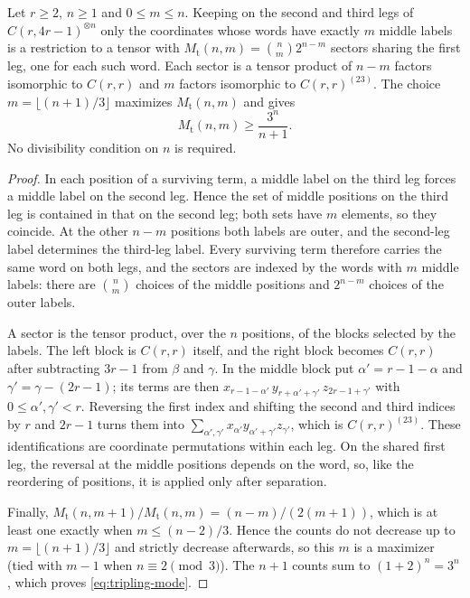 \begin{lemma}\label{lem:tripling}
Let \(r\ge2\), \(n\ge1\) and \(0\le m\le n\). Keeping on the second and
third legs of \(C(r,4r-1)^{\otimes n}\) only the coordinates whose words
have exactly \(m\) middle labels is a restriction to a tensor with
\(M_{\mathrm t}(n,m)=\binom nm2^{n-m}\) sectors sharing the first leg, one
for each such word. Each sector is a tensor product of \(n-m\) factors
isomorphic to \(C(r,r)\) and \(m\) factors isomorphic to
\(C(r,r)^{(23)}\). The choice \(m=\lfloor(n+1)/3\rfloor\) maximizes
\(M_{\mathrm t}(n,m)\) and gives
\begin{equation}\label{eq:tripling-mode}
 M_{\mathrm t}(n,m)\ge\frac{3^n}{n+1}.
\end{equation}
No divisibility condition on \(n\) is required.
\end{lemma}

\begin{proof}
In each position of a surviving term, a middle label on the third leg
forces a middle label on the second leg. Hence the set of middle positions
on the third leg is contained in that on the second leg; both sets have
\(m\) elements, so they coincide. At the other \(n-m\) positions both
labels are outer, and the second-leg label determines the third-leg label.
Every surviving term therefore carries the same word on both legs, and the
sectors are indexed by the words with \(m\) middle labels: there are
\(\binom nm\) choices of the middle positions and \(2^{n-m}\) choices of
the outer labels.

A sector is the tensor product, over the \(n\) positions, of the blocks
selected by the labels. The left block is \(C(r,r)\) itself, and the right
block becomes \(C(r,r)\) after subtracting \(3r-1\) from \(\beta\) and
\(\gamma\). In the middle block put \(\alpha'=r-1-\alpha\) and
\(\gamma'=\gamma-(2r-1)\); its terms are then
\(x_{r-1-\alpha'}\,y_{r+\alpha'+\gamma'}\,z_{2r-1+\gamma'}\) with
\(0\le\alpha',\gamma'<r\). Reversing the first index and shifting the
second and third indices by \(r\) and \(2r-1\) turns them into
\(\sum_{\alpha',\gamma'}x_{\alpha'}y_{\alpha'+\gamma'}z_{\gamma'}\), which is
\(C(r,r)^{(23)}\). These identifications are coordinate permutations
within each leg. On the shared first leg, the reversal at the middle
positions depends on the word, so, like the reordering of positions, it is
applied only after separation.

Finally,
\(M_{\mathrm t}(n,m+1)/M_{\mathrm t}(n,m)=(n-m)/(2(m+1))\), which is at
least one exactly when \(m\le(n-2)/3\). Hence the counts do not decrease
up to \(m=\lfloor(n+1)/3\rfloor\) and strictly decrease afterwards, so this
\(m\) is a maximizer (tied with \(m-1\) when \(n\equiv2\pmod3\)). The
\(n+1\) counts sum to \((1+2)^n=3^n\), which proves
\eqref{eq:tripling-mode}.
\end{proof}

